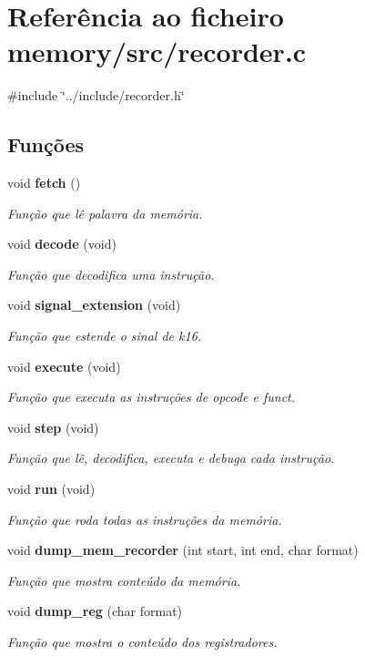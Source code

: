 \section{Referência ao ficheiro memory/src/recorder.c}
\label{recorder_8c}
{\ttfamily \#include \char`\"{}../include/recorder.\+h\char`\"{}}\newline
\subsection*{Funções}
\begin{DoxyCompactItemize}
\item 
void \textbf{ fetch} ()
\begin{DoxyCompactList}\small\item\em Função que lê palavra da memória. \end{DoxyCompactList}\item 
void \textbf{ decode} (void)
\begin{DoxyCompactList}\small\item\em Função que decodifica uma instrução. \end{DoxyCompactList}\item 
void \textbf{ signal\+\_\+extension} (void)
\begin{DoxyCompactList}\small\item\em Função que estende o sinal de k16. \end{DoxyCompactList}\item 
void \textbf{ execute} (void)
\begin{DoxyCompactList}\small\item\em Função que executa as instruções de opcode e funct. \end{DoxyCompactList}\item 
void \textbf{ step} (void)
\begin{DoxyCompactList}\small\item\em Função que lê, decodifica, executa e debuga cada instrução. \end{DoxyCompactList}\item 
void \textbf{ run} (void)
\begin{DoxyCompactList}\small\item\em Função que roda todas as instruções da memória. \end{DoxyCompactList}\item 
void \textbf{ dump\+\_\+mem\+\_\+recorder} (int start, int end, char format)
\begin{DoxyCompactList}\small\item\em Função que mostra conteúdo da memória. \end{DoxyCompactList}\item 
void \textbf{ dump\+\_\+reg} (char format)
\begin{DoxyCompactList}\small\item\em Função que mostra o conteúdo dos registradores. \end{DoxyCompactList}\end{DoxyCompactItemize}


